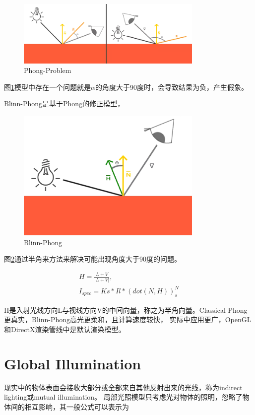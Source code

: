 \begin{figure}[htbp]
    \centering
    \includegraphics[width=0.8\textwidth]{images/classical-phong.png}
    \caption{Phong-Problem}\label{Phong-Problem}
\end{figure}
图\ref{Phong-Problem}模型中存在一个问题就是$\alpha$的角度大于90度时，会导致结果为负，产生假象。

Blinn-Phong是基于Phong的修正模型，

\begin{figure}[htbp]
    \centering
    \includegraphics[width=0.8\textwidth]{images/blinn-phong.png}
    \caption{Blinn-Phong}\label{Blinn-Phong}
\end{figure}

图\ref{Blinn-Phong}通过半角来方法来解决可能出现角度大于90度的问题。

\begin{align*}
    H = \frac{L + V}{|L + V|}, \\
    I_{spec} = Ks * Il * (dot(N, H))^N_{s}
\end{align*}

H是入射光线方向L与视线方向V的中间向量，称之为半角向量。Classical-Phong更真实，Blinn-Phong高光更柔和，且计算速度较快，
实际中应用更广，OpenGL和DirectX渲染管线中是默认渲染模型。

\section{Global Illumination}
现实中的物体表面会接收大部分或全部来自其他反射出来的光线，称为indirect lighting或mutual illumination。
局部光照模型只考虑光对物体的照明，忽略了物体间的相互影响，其一般公式可以表示为

